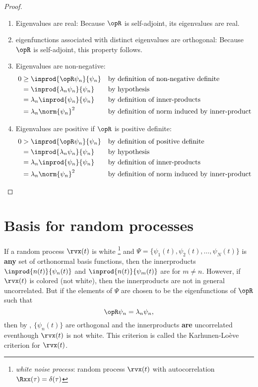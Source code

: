 \begin{proof}
\begin{enumerate}
\item Eigenvalues are real:
Because $\opR$ is self-adjoint, its eigenvalues are real.

\item eigenfunctions associated with distinct eigenvalues are orthogonal:
Because $\opR$ is self-adjoint, this property follows.

\item Eigenvalues are non-negative:
\begin{align*}
   0 &\ge \inprod{\opR \psi_n}{\psi_n}
     &&   \text{by definition of non-negative definite}
   \\&=   \inprod{\lambda_n \psi_n}{\psi_n}
     &&   \text{by hypothesis}
   \\&=   \lambda_n \inprod{\psi_n}{\psi_n}
     &&   \text{by definition of inner-products}
   \\&=   \lambda_n \norm{\psi_n}^2
     &&   \text{by definition of norm induced by inner-product}
\end{align*}

\item Eigenvalues are positive if $\opR$ is positive definite:
\begin{align*}
   0 &> \inprod{\opR \psi_n}{\psi_n}
     && \text{by definition of positive definite}
   \\&= \inprod{\lambda_n \psi_n}{\psi_n}
     && \text{by hypothesis}
   \\&= \lambda_n \inprod{\psi_n}{\psi_n}
     && \text{by definition of inner-products}
   \\&= \lambda_n \norm{\psi_n}^2
     && \text{by definition of norm induced by inner-product}
\end{align*}

\end{enumerate}
\end{proof}


\section{Basis for random processes}
\label{sec:KL}
If a random process $\rvx(t)$ is white
\footnote{{\em white noise process}: random process $\rvx(t)$ with autocorrelation $\Rxx(\tau)=\delta(\tau)$}
and $\Psi=\{\psi_1(t),\psi_2(t),\ldots,\psi_N(t)\}$ is \textbf{any} set of orthonormal basis functions,
then the innerproducts
$\inprod{n(t)}{\psi_n(t)}$ and $\inprod{n(t)}{\psi_m(t)}$ are 
for $m\ne  n$.
However, if $\rvx(t)$ is colored (not white), then the innerproducts are not
in general uncorrelated.
But if the elements of $\Psi$ are chosen to be the eigenfunctions of $\opR$ such
that
\[ \opR \psi_n = \lambda_n \psi_n,\]
then by , $\{\psi_n(t)\}$ are orthogonal and
the innerproducts \textbf{are} uncorrelated eventhough $\rvx(t)$ is
not white.
This criterion is called the  Karhunen-Lo\`{e}ve criterion for $\rvx(t)$.

